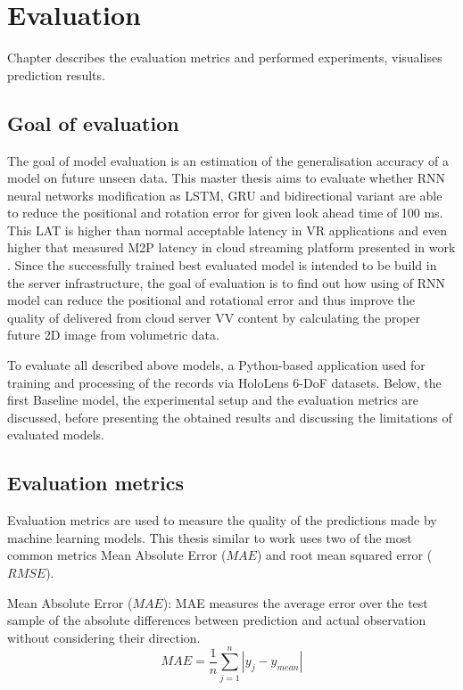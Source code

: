 
\chapter{Evaluation}
\label{sec:eval}
Chapter describes the evaluation metrics and performed experiments, visualises prediction results.

\section{Goal of evaluation}
\label{sec:eval:goal}
The goal of model evaluation is an estimation of the generalisation accuracy of a model on future unseen data. This master thesis aims to evaluate whether RNN neural networks modification as LSTM, GRU and bidirectional variant are able to reduce the positional and rotation error for given look ahead time of 100 ms. This LAT is higher than normal acceptable latency in VR applications and even higher that measured M2P latency in cloud streaming platform presented in work \cite{serhan_cloud_streaming}. Since the successfully trained best evaluated model is intended to be build in the server infrastructure, the goal of evaluation is to find out how using of RNN model can reduce the positional and rotational error and thus improve the quality of delivered from cloud server VV content by calculating the proper future 2D image from volumetric data.  

To evaluate all described above models, a Python-based application used for training and processing of the records via HoloLens 6-DoF datasets. Below, the first Baseline model, the experimental setup and the evaluation metrics are discussed, before presenting the obtained results and discussing the limitations of evaluated models.

\section{Evaluation metrics}
\label{sec:eval:metrics}
Evaluation metrics are used to measure the quality of the predictions made by machine learning models. This thesis similar to work \cite{serhan_kalman} uses two of the most common metrics Mean Absolute Error ($MAE$) and root mean squared error ($RMSE$).

Mean Absolute Error ($MAE$): MAE measures the average error over the test sample of the absolute differences between prediction and actual observation without considering their direction. 
\begin{equation}
MAE= \frac{1}{n} \sum_{j=1}^{n} |y_j - y_{mean}|
\end{equation}


